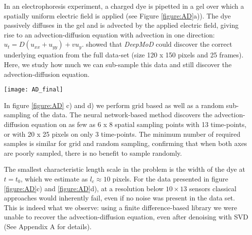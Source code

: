 \documentclass{article} %
\begin{document}
In an electrophoresis experiment, a charged dye is pipetted in a gel over which a spatially uniform electric field is applied (see Figure \ref{figure:AD}a)). The dye passively diffuses in the gel and is advected by the applied electric field, giving rise to an advection-diffusion equation with advection in one direction: $u_t = D (u_{xx} + u_{yy}) + v u_y$. \cite{both2019} showed that \emph{DeepMoD} could discover the correct underlying equation from the full data-set (size 120 x 150 pixels and 25 frames). Here, we study how much we can sub-sample this data and still discover the advection-diffusion equation.

\begin{figure*}[t]
    \centering
    \texttt{[image: AD\_final]}
    \caption{a) Experimental setup of the gel electrophoresis. b) Three time frames of the density  with a spatial resolution of 20x25. c) and d) Success diagram for the experimental data indicating correct model discovery (Yellow indicates the correct AD equation $u_t = D (u_{xx} + u_{yy}) + v u_y$ is discovered) as function of the spatial and temporal resolution for c) grid sampling and d) random sampling. e) Obtained mask and coefficients ($D = 0.025$ and and $v = (0, 0.2)$) for the artificial data-set as function of the noise level (11x11 spatial resolution). Hereby, yellow indicates the terms selected by the algorithm and the red dashed box the terms that are expected in the PDE. f) Success diagrams for various levels of additive noise, comparing the result of DeepMoD with a grid and random sampling strategy and the classical LassoCV algorithm on a Finite Difference (FD)-based library (after SVD filtering of the different frames).}
    \label{figure:AD}
\end{figure*}

In figure \ref{figure:AD} c) and d) we perform grid based as well as a random sub-sampling of the data. The neural network-based method discovers the advection-diffusion equation on as few as 6 x 8 spatial sampling points with 13 time-points, or with 20 x 25 pixels on only 3 time-points. The minimum number of required samples is similar for grid and random sampling, confirming that when both axes are poorly sampled, there is no benefit to sample randomly. 

The smallest characteristic length scale in the problem is the width of the dye at $t=t_0$, which we estimate as $l_c \approx 10$ pixels. For the data presented in figure \ref{figure:AD}c) and \ref{figure:AD}d), at a resolution below $10 \times 13$ sensors classical approaches would inherently fail, even if no noise was present in the data set. This is indeed what we observe: using a finite difference-based library we were unable to recover the advection-diffusion equation, even after denoising with SVD (See Appendix A for details).
\end{document}
